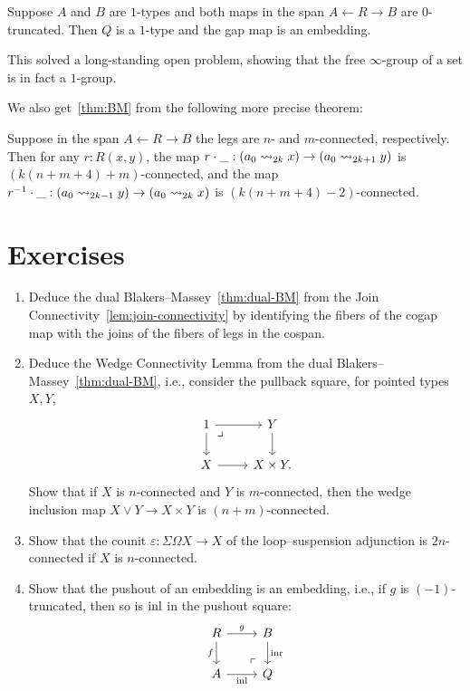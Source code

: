 \documentclass[10pt,oneside,leqno,openright]{memoir}
\newcommand*{\sto}{\rightsquigarrow}
\begin{document}
\begin{corollary}
  Suppose $A$ and $B$ are $1$-types and both maps in the span
  $A \leftarrow R\to B$ are $0$-truncated. Then $Q$ is a $1$-type and the gap
  map is an embedding.
\end{corollary}
This solved a long-standing open problem, showing that the free $\infty$-group
of a set is in fact a $1$-group.

We also get~\cref{thm:BM} from the following more precise theorem:

\begin{theorem}
  Suppose in the span $A \leftarrow R\to B$ the legs are $n$- and $m$-connected,
  respectively.  Then for any $r:R(x,y)$, the map
  $r\cdot\blank : (a_0 \sto_{2k} x) \to (a_0 \sto_{2k+1} y)$ is
  $(k(n+m+4)+m)$-connected, and the map
  $r^{-1}\cdot\blank : (a_0 \sto_{2k-1} y) \to (a_0 \sto_{2k} x)$ is
  $(k(n+m+4)-2)$-connected.
\end{theorem}

\section{Exercises}

\begin{enumerate}
\item Deduce the dual Blakers--Massey~\cref{thm:dual-BM} from the Join
  Connectivity~\cref{lem:join-connectivity} by identifying the fibers of the
  cogap map with the joins of the fibers of legs in the cospan.

\item Deduce the Wedge Connectivity Lemma from the dual Blakers--Massey~\cref{thm:dual-BM},
  i.e., consider the pullback square, for pointed types $X,Y$,
  \[
    \begin{tikzcd}
      1 \ar[d]\ar[r]\pbcorner & Y \ar[d] \\
      X \ar[r] & X\times Y.
    \end{tikzcd}
  \]
  Show that if $X$ is $n$-connected and $Y$ is $m$-connected, then the wedge
  inclusion map $X \vee Y \to X \times Y$ is $(n+m)$-connected.

\item Show that the counit $\varepsilon : \Sigma\Omega X \to X$ of the loop--suspension adjunction is $2n$-connected if $X$ is $n$-connected.

\item Show that the pushout of an embedding is an embedding, i.e., if $g$ is $(-1)$-truncated, then so is $\operatorname{inl}$ in the pushout square:
  \[
    \begin{tikzcd}
      R \ar[d,"f"']\ar[r,"g"]\pocorner & B\ar[d,"{\inr}"] \\
      A\ar[r,"{\inl}"'] & Q
    \end{tikzcd}
  \]
\end{enumerate}
\end{document}
